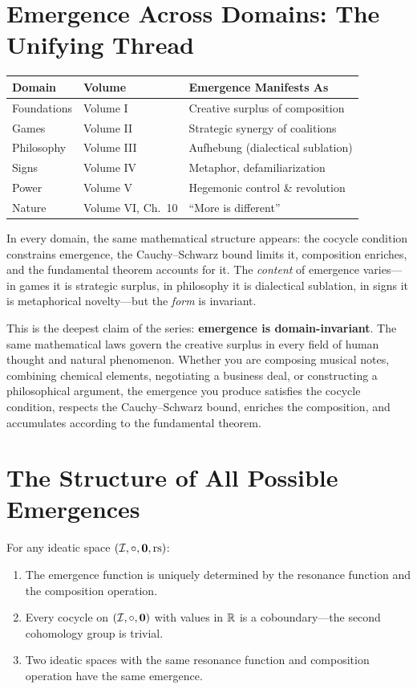 \section{Emergence Across Domains: The Unifying Thread}

\begin{center}
\begin{tabular}{p{3.2cm} p{4cm} p{5.5cm}}
\hline
\textbf{Domain} & \textbf{Volume} & \textbf{Emergence Manifests As} \\
\hline
Foundations & Volume I & Creative surplus of composition \\
Games & Volume II & Strategic synergy of coalitions \\
Philosophy & Volume III & Aufhebung (dialectical sublation) \\
Signs & Volume IV & Metaphor, defamiliarization \\
Power & Volume V & Hegemonic control \& revolution \\
Nature & Volume VI, Ch.~10 & ``More is different'' \\
\hline
\end{tabular}
\end{center}

In every domain, the same mathematical structure appears: the cocycle condition
constrains emergence, the Cauchy--Schwarz bound limits it, composition enriches,
and the fundamental theorem accounts for it. The \emph{content} of emergence
varies---in games it is strategic surplus, in philosophy it is dialectical
sublation, in signs it is metaphorical novelty---but the \emph{form} is invariant.

This is the deepest claim of the series: \textbf{emergence is domain-invariant}.
The same mathematical laws govern the creative surplus in every field of human
thought and natural phenomenon. Whether you are composing musical notes, combining
chemical elements, negotiating a business deal, or constructing a philosophical
argument, the emergence you produce satisfies the cocycle condition, respects the
Cauchy--Schwarz bound, enriches the composition, and accumulates according to
the fundamental theorem.


\section{The Structure of All Possible Emergences}

\begin{theorem}
\label{thm:emergence-determined}
For any ideatic space $(\mathcal{I}, \circ, \mathbf{0}, \mathrm{rs})$:
\begin{enumerate}
  \item The emergence function is uniquely determined by the resonance function
    and the composition operation.
  \item Every cocycle on $(\mathcal{I}, \circ, \mathbf{0})$ with values in $\mathbb{R}$ is a
    coboundary---the second cohomology group is trivial.
  \item Two ideatic spaces with the same resonance function and composition
    operation have the same emergence.
\end{enumerate}
\end{theorem}

